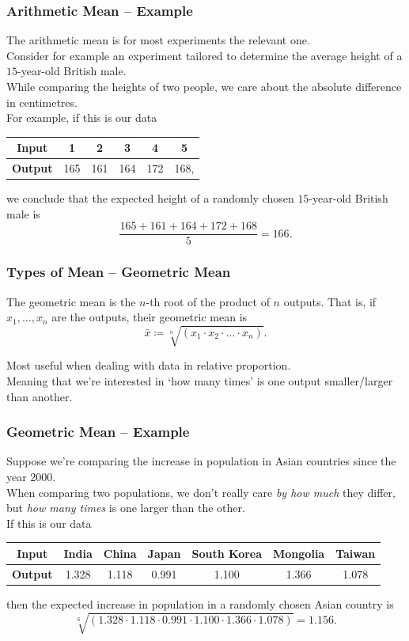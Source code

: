 \documentclass[aspectratio=169,11pt,svgnames]{beamer}
\begin{document}
\begin{frame}
 \frametitle{Arithmetic Mean -- Example}
 The arithmetic mean is for most experiments the relevant one.\\
 \pause
 Consider for example an experiment tailored to determine the average height of
 a $15$-year-old British male.\\
 \pause
 While comparing the heights of two people, we care about the \alert{absolute}
 difference in centimetres.\\
 \pause
 For example, if this is our data
 \begin{center}
  \begin{tabular}{c|ccccc}
   \textbf{Input} & 1 & 2 & 3 & 4 & 5\\
   \midrule
   \textbf{Output} & 165 & 161 & 164 & 172 & 168,
  \end{tabular}
 \end{center}
 we conclude that the expected height of a randomly chosen $15$-year-old British
 male is
 \[
  \frac{165 + 161 + 164 + 172 + 168}{5} = 166.
 \]
\end{frame}

\begin{frame}
 \frametitle{Types of Mean -- Geometric Mean}
 \begin{tcolorbox}[title=Geometric Mean]
  The \alert{geometric mean} is the $n$-th root of the product of $n$ outputs.
  That is, if $x_1,\ldots,x_n$ are the outputs, their geometric mean is
  \[
   \bar{x} \coloneqq \sqrt[n]{(x_1 \cdot x_2 \cdot \ldots \cdot x_n)}.
  \]
 \end{tcolorbox}
 \pause
 Most useful when dealing with data in \alert{relative} proportion.\\
 \pause
 Meaning that we're interested in `\alert{how many times}' is one output
 smaller/larger than another.
\end{frame}

\begin{frame}
 \frametitle{Geometric Mean -- Example}
 Suppose we're comparing the increase in population in Asian countries since the
 year 2000.\\
 \pause
 When comparing two populations, we don't really care \emph{by how much} they
 differ, but \emph{how many times} is one larger than the other.\\
 \pause
 If this is our data
 \begin{center}
  \begin{tabular}{c|cccccc}
   \textbf{Input} & India & China & Japan & South Korea & Mongolia & Taiwan\\
   \midrule
   \textbf{Output} & 1.328 & 1.118 & 0.991 & 1.100 & 1.366 & 1.078
  \end{tabular}
 \end{center}
 then the expected increase in population in a randomly chosen Asian country is
 \[
  \sqrt[6]{(1.328 \cdot 1.118 \cdot 0.991 \cdot 1.100 \cdot 1.366 \cdot 1.078)}
  = 1.156.
 \]
\end{frame}
\end{document}
